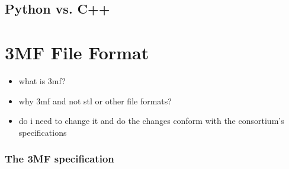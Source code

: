 \subsection{Python vs. C++}

\section{3MF File Format}
\begin{itemize}
    \item what is 3mf?    
    \item why 3mf and not stl or other file formats?
    \item do i need to change it and do the changes conform with the consortium's specifications 
\end{itemize}

\subsubsection{The 3MF specification} \cite{3mf_consortium_3mf_2025}
